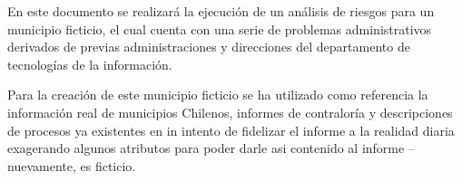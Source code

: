 En este documento se realizará la ejecución de un análisis de riesgos para un municipio ficticio, el cual cuenta con una serie de problemas administrativos derivados de previas administraciones y direcciones del departamento de tecnologías de la información.

Para la creación de este municipio ficticio se ha utilizado como referencia la información real de municipios Chilenos, informes de contraloría y descripciones de procesos ya existentes en in intento de fidelizar el informe a la realidad diaria exagerando algunos atributos para poder darle asi contenido al informe -- nuevamente, es ficticio.